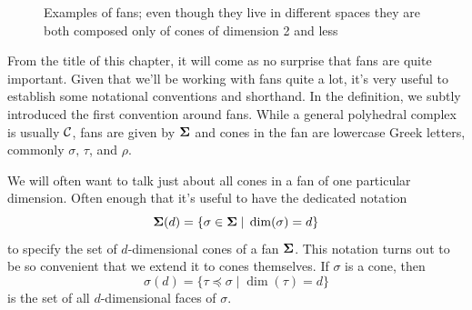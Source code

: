 \documentclass[12pt,oneside]{../../sfsuthesis}
\begin{document}
\begin{figure}[H]
\begin{subfigure}{0.48\textwidth}
    \end{subfigure}
    \caption{Examples of fans; even though they live in different spaces they are both composed only of cones of dimension 2 and less}
    \label{fig:fans}
\end{figure}
From the title of this chapter, it will come as no surprise that fans are quite important.
Given that we'll be working with fans quite a lot, it's very useful to establish some notational conventions and shorthand.
In the definition, we subtly introduced the first convention around fans.
While a general polyhedral complex is usually \( \mathcal{C} \), fans are given by \( {\bm{\Sigma}} \) and cones in the fan are lowercase Greek letters, commonly \( \sigma,\,\tau\), and \( \rho \).

We will often want to talk just about all cones in a fan of one particular dimension.
Often enough that it's useful to have the dedicated notation
\[
    {\bm{\Sigma}}(d) = \{ \sigma \in {\bm{\Sigma}} \; | \; \dim(\sigma) = d \}
\]
to specify the set of \( d \)-dimensional cones of a fan \( {\bm{\Sigma}} \).
This notation turns out to be so convenient that we extend it to cones themselves.
If \( \sigma \) is a cone, then
\[
    \sigma(d) = \{ \tau \preceq \sigma \; | \; \dim(\tau) = d \}
\]
is the set of all \( d \)-dimensional faces of \( \sigma \).
\end{document}
